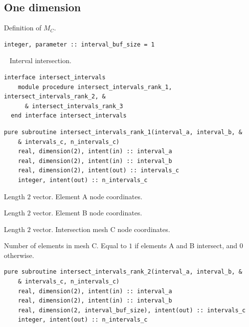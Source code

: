 \documentclass{article}
\begin{document}
\subsection{One dimension}\label{sect:1D_intersection}

Definition of $M_C$.
  
\begin{lstlisting}[language=FORTRAN] 
  integer, parameter :: interval_buf_size = 1
\end{lstlisting}

~\newline
Interval intersection.
  
\begin{lstlisting}[language=FORTRAN]    
  interface intersect_intervals
    module procedure intersect_intervals_rank_1, intersect_intervals_rank_2, &
      & intersect_intervals_rank_3
  end interface intersect_intervals
\end{lstlisting}

\begin{lstlisting}[language=FORTRAN]   
  pure subroutine intersect_intervals_rank_1(interval_a, interval_b, &
    & intervals_c, n_intervals_c)
    real, dimension(2), intent(in) :: interval_a
    real, dimension(2), intent(in) :: interval_b
    real, dimension(2), intent(out) :: intervals_c
    integer, intent(out) :: n_intervals_c
\end{lstlisting} 

\begin{description}[font=\ttfamily\bfseries,leftmargin=2.2\parindent,labelindent=1.7\parindent,noitemsep]
  \item[interval\_a] Length $2$ vector. Element A node coordinates.
  \item[interval\_b] Length $2$ vector. Element B node coordinates.
  \item[interval\_c] Length $2$ vector. Intersection mesh C node coordinates.
  \item[n\_intervals\_c] Number of elements in mesh C. Equal to $1$ if elements
    A and B intersect, and $0$ otherwise.
\end{description}
  
\begin{lstlisting}[language=FORTRAN]   
  pure subroutine intersect_intervals_rank_2(interval_a, interval_b, &
    & intervals_c, n_intervals_c)
    real, dimension(2), intent(in) :: interval_a
    real, dimension(2), intent(in) :: interval_b
    real, dimension(2, interval_buf_size), intent(out) :: intervals_c
    integer, intent(out) :: n_intervals_c
\end{lstlisting} 
\end{document}
